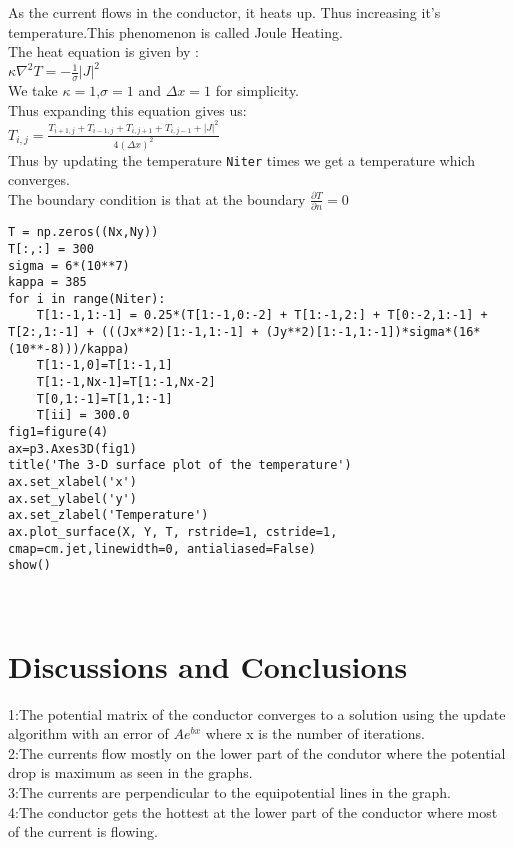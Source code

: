 \documentclass[11pt]{article}
\begin{document}
As the current flows in the conductor, it heats up. Thus increasing it's
temperature.This phenomenon is called Joule Heating.\\The heat equation is
given by :\\\(\kappa \nabla^2{T}=-\frac{1}{\sigma} {|J|^2}\) \\We take
\(\kappa=1\),\(\sigma=1\) and \(\Delta{x}=1\) for simplicity. \\Thus
expanding this equation gives us:\\
\(T_{i,j}= \frac{T_{i+1,j}+T_{i-1,j}+T_{i,j+1}+T_{i,j-1}+|J|^2}{4(\Delta{x})^2}\)
\\Thus by updating the temperature \texttt{Niter} times we get a
temperature which converges. \\The boundary condition is that at the
boundary \(\frac{\partial{T}}{\partial{n}}=0\)

    \begin{Verbatim}
T = np.zeros((Nx,Ny))
T[:,:] = 300
sigma = 6*(10**7)
kappa = 385
for i in range(Niter):
    T[1:-1,1:-1] = 0.25*(T[1:-1,0:-2] + T[1:-1,2:] + T[0:-2,1:-1] + T[2:,1:-1] + (((Jx**2)[1:-1,1:-1] + (Jy**2)[1:-1,1:-1])*sigma*(16*(10**-8)))/kappa)
    T[1:-1,0]=T[1:-1,1]
    T[1:-1,Nx-1]=T[1:-1,Nx-2]
    T[0,1:-1]=T[1,1:-1]
    T[ii] = 300.0
fig1=figure(4)
ax=p3.Axes3D(fig1)
title('The 3-D surface plot of the temperature')
ax.set_xlabel('x')
ax.set_ylabel('y')
ax.set_zlabel('Temperature')
ax.plot_surface(X, Y, T, rstride=1, cstride=1, cmap=cm.jet,linewidth=0, antialiased=False)
show()
\end{Verbatim}


    \begin{center}
    \end{center}
    { \hspace*{\fill} \\}
\newpage    
    \hypertarget{discussions-and-conclusions}{%
\section{Discussions and
Conclusions}\label{discussions-and-conclusions}}

1:The potential matrix of the conductor converges to a solution using
the update algorithm with an error of \(Ae^{bx}\) where x is the number
of iterations.\\ 2:The currents flow mostly on the lower part of the
condutor where the potential drop is maximum as seen in the graphs.\\
3:The currents are perpendicular to the equipotential lines in the
graph.\\ 4:The conductor gets the hottest at the lower part of the
conductor where most of the current is flowing.\\


    
    
    
    
\end{document}
